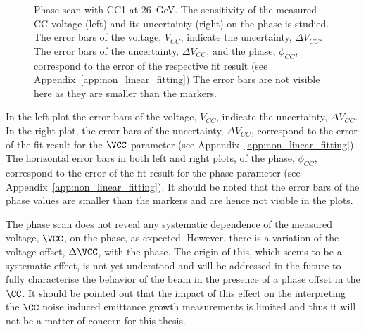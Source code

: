 \begin{figure}[!ht]
\begin{subfigure}[t]{0.45\textwidth}
   \end{subfigure}
   \hfill
    \caption{Phase scan with CC1 at 26\, GeV. The sensitivity of the measured CC voltage (left) and its uncertainty (right) on the phase is studied. The error bars of the voltage, $V_{CC}$, indicate the uncertainty, $\Delta V_{CC}$. The error bars of the uncertainty, $\Delta V_{CC}$, and the phase, $\phi_{CC}$, correspond to the error of the respective fit result (see Appendix~\ref{app:non_linear_fitting}) The error bars are not visible here as they are smaller than the markers.
    }
    \label{fig:phase_scan_CC1}
\end{figure}

In the left plot the error bars of the voltage, $V_{CC}$, indicate the uncertainty, $\Delta V_{CC}$. In the right plot, the error bars of the uncertainty, $\Delta V_{CC}$, correspond to the error of the fit result for the $\VCC$ parameter  (see Appendix~\ref{app:non_linear_fitting}). The horizontal error bars in both left and right plots, of the phase, $\phi_{CC}$, correspond to the error of the fit result for the phase parameter (see Appendix~\ref{app:non_linear_fitting}). It should be noted that the error bars of the 
phase values are smaller than the markers and are hence not visible in the plots. 

The phase scan does not reveal any systematic dependence of the measured voltage, $\VCC$, on the phase, as expected. However, there is a variation of the voltage offset, $\Delta \VCC$, with the phase. The origin of this, which seems to be a systematic effect, is not yet understood and will be addressed in the future to fully characterise the behavior of the beam in the presence of a phase offset in the $\CC$. It should be pointed out that the impact of this effect on the interpreting the $\CC$ noise induced emittance growth measurements is limited and thus it will not be a matter of concern for this thesis. 

